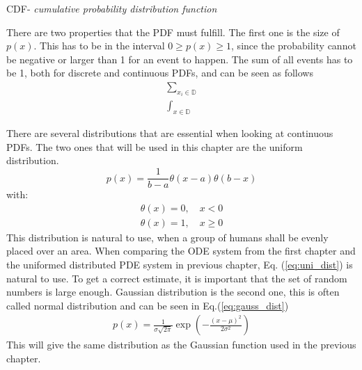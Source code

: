 \documentclass[%
twoside,                 %
final,                   %
chapterprefix=true,      %
open=right               %
10pt]{book}
\begin{document}
CDF- \emph{cumulative probability distribution function}

There are two properties that the PDF must fulfill. The first one is the size of $p(x)$. This has to be in the interval $0\geq p(x) \geq 1$, since the probability cannot be negative or larger than 1 for an event to happen. The sum of all events has to be 1, both for discrete and continuous PDFs, and can be seen as follows
\begin{equation}
	\begin{aligned}
    \sum_{x_i \in \mathbb{D}}\\
    \int_{x \in \mathbb{D}}
	\end{aligned}
\end{equation} 

There are several distributions that are essential when looking at continuous PDFs. The two ones that will be used in this chapter are the uniform distribution.
\begin{equation} \label{eq:uni_dist}
p(x) = \frac{1}{b-a}\theta(x-a)\theta(b-x)
\end{equation}
with:
\begin{equation}
	\begin{aligned}
    \theta(x) = 0,\quad x < 0 \\
    \theta(x) = 1,\quad x \geq 0
	\end{aligned}
\end{equation}
This distribution is natural to use, when a group of humans shall be evenly placed over an area. When comparing the ODE system from the first chapter and the uniformed distributed PDE system in previous chapter, Eq. (\ref{eq:uni_dist}) is natural to use. To get a correct estimate, it is important that the set of random numbers is large enough. Gaussian distribution is the second one, this is often called normal distribution and can be seen in Eq.(\ref{eq:gauss_dist})
\begin{equation} \label{eq:gauss_dist}
	\begin{aligned}
    p(x) = \frac{1}{\sigma \sqrt{2\pi}} \exp(-\frac{(x-\mu)^2}{2\sigma^2})
	\end{aligned}
\end{equation}
This will give the same distribution as the Gaussian function used in the previous chapter. 
\end{document}

